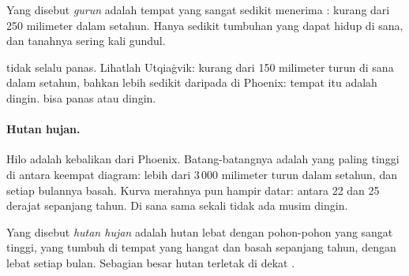 \begin{definition}[Gurun]\label{def:g5:weather-and-climate:desert}
Yang disebut \emph{gurun} adalah tempat yang sangat sedikit
menerima : kurang dari 250 milimeter dalam setahun. Hanya sedikit
tumbuhan yang dapat hidup di sana, dan tanahnya sering kali gundul.
\end{definition}

 tidak selalu panas. Lihatlah Utqiaġvik: kurang dari 150 milimeter
 turun di sana dalam setahun, bahkan lebih sedikit daripada di
Phoenix: tempat itu adalah  dingin.  bisa panas atau dingin.

\paragraph{Hutan hujan.} Hilo adalah kebalikan dari Phoenix. Batang-batangnya
adalah yang paling tinggi di antara keempat diagram: lebih dari
3\,000 milimeter  turun dalam setahun, dan setiap bulannya basah.
Kurva merahnya pun hampir datar: antara 22 dan 25 derajat sepanjang tahun.
Di sana sama sekali tidak ada musim dingin.

\begin{definition}\label{def:g5:weather-and-climate:rainforest}
Yang disebut \emph{hutan hujan} adalah hutan lebat dengan
pohon-pohon yang sangat tinggi, yang tumbuh di tempat yang hangat dan basah
sepanjang tahun, dengan  lebat setiap bulan. Sebagian besar hutan 
terletak di dekat .
\end{definition}

